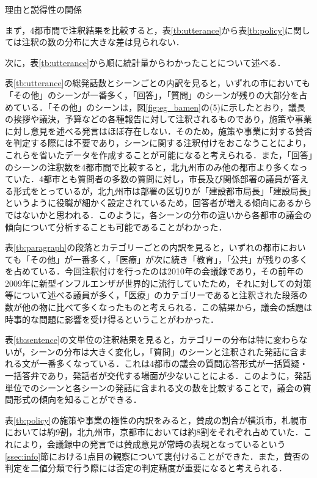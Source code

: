 \documentclass[japanese]{jnlp_1.4}
\begin{document}
\begin{table}[t]
 \caption{理由と説得性の関係}
 \label{tb:reaper}

\end{table}

まず，4都市間で注釈結果を比較すると，表\ref{tb:utterance}から表\ref{tb:policy}に関しては注釈の数の分布に大きな差は見られない．

次に，表\ref{tb:utterance}から順に統計量からわかったことについて述べる．

表\ref{tb:utterance}の総発話数とシーンごとの内訳を見ると，いずれの市においても「その他」のシーンが一番多く，「回答」，「質問」のシーンが残りの大部分を占めている．「その他」のシーンは，図\ref{fig:eg_bamen}の(5)に示したとおり，議長の挨拶や議決，予算などの各種報告に対して注釈されるものであり，施策や事業に対し意見を述べる発言はほぼ存在しない．そのため，施策や事業に対する賛否を判定する際には不要であり，シーンに関する注釈付けをおこなうことにより，これらを省いたデータを作成することが可能になると考えられる．また，「回答」のシーンの注釈数を4都市間で比較すると，北九州市のみ他の都市より多くなっていた．4都市とも質問者の多数の質問に対し，市長及び関係部署の議員が答える形式をとっているが，北九州市は部署の区切りが「建設都市局長」「建設局長」というように役職が細かく設定されているため，回答者が増える傾向にあるからではないかと思われる．このように，各シーンの分布の違いから各都市の議会の傾向について分析することも可能であることがわかった．

表\ref{tb:paragraph}の段落とカテゴリーごとの内訳を見ると，いずれの都市においても「その他」が一番多く，「医療」が次に続き「教育」，「公共」が残りの多くを占めている．今回注釈付けを行ったのは2010年の会議録であり，その前年の2009年に新型インフルエンザが世界的に流行していたため，それに対しての対策等について述べる議員が多く，「医療」のカテゴリーであると注釈された段落の数が他の物に比べて多くなったものと考えられる．この結果から，議会の話題は時事的な問題に影響を受け得るということがわかった．

表\ref{tb:sentence}の文単位の注釈結果を見ると，カテゴリーの分布は特に変わらないが，シーンの分布は大きく変化し，「質問」のシーンと注釈された発話に含まれる文が一番多くなっている．これは4都市の議会の質問応答形式が一括質疑・一括答弁であり，発話者が交代する場面が少ないことによる．このように，発話単位でのシーンと各シーンの発話に含まれる文の数を比較することで，議会の質問形式の傾向を知ることができる．

表\ref{tb:policy}の施策や事業の極性の内訳をみると，賛成の割合が横浜市，札幌市においては約9割，北九州市，京都市においては約8割をそれぞれ占めていた．これにより，会議録中の発言では賛成意見が常時の表現となっているという\ref{ssec:info}節における1点目の観察について裏付けることができた．また，賛否の判定を二値分類で行う際には否定の判定精度が重要になると考えられる．
\end{document}
